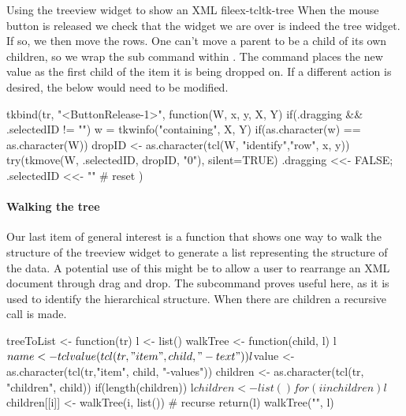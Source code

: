 \begin{example}{Using the treeview widget to show an XML file}{ex-tcltk-tree}
When the mouse button is released we check that the widget we are over
is indeed the tree widget. If so, we then move the rows. One can't
move a parent to be a child of its own children, so we wrap the
 sub command within . The
 command places the new value as the first child of the
item it is being dropped on. If a different action is desired, the
 below would need to be modified.
\begin{Schunk}
\begin{Sinput}
 tkbind(tr, "<ButtonRelease-1>", function(W, x, y, X, Y) {
   if(.dragging && .selectedID != "") {
     w = tkwinfo("containing", X, Y)
     if(as.character(w) == as.character(W)) {
       dropID <- as.character(tcl(W, "identify","row", x, y))
       try(tkmove(W, .selectedID, dropID, "0"), silent=TRUE)
     }
   }
   .dragging <<- FALSE; .selectedID <<- "" # reset
 })
\end{Sinput}
\end{Schunk}

\paragraph{Walking the tree}
Our last item of general interest is a function that shows one way to
walk the structure of the treeview widget to generate a list
representing the structure of the data.  A potential use of this might
be to allow a user to rearrange an XML document through drag and drop.
The subcommand  proves useful here,
as it is used to identify the hierarchical structure. When there are children a recursive call is made.



\begin{Schunk}
\begin{Sinput}
 treeToList <- function(tr) {
   l <- list()
   walkTree <- function(child, l) {
     l$name <- tclvalue(tcl(tr,"item", child, "-text"))
     l$value <- as.character(tcl(tr,"item", child, "-values"))
     children <- as.character(tcl(tr, "children", child)) 
     if(length(children)) {
       l$children <- list()
       for(i in children) 
         l$children[[i]] <- walkTree(i, list()) # recurse
     }
     return(l)
   }
   walkTree("", l)
 }
 
\end{Sinput}
\end{Schunk}
\end{example}



